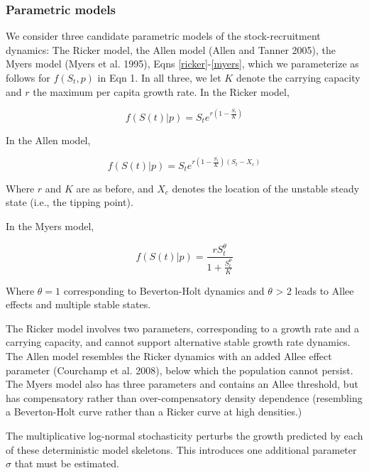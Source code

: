 \documentclass[author-year, 12pt,review]{components/elsarticle} %
\begin{document}
\subsubsection{Parametric models}\label{parametric-models}

We consider three candidate parametric models of the stock-recruitment
dynamics: The Ricker model, the Allen model (Allen and Tanner 2005), the
Myers model (Myers et al. 1995), Eqns \eqref{ricker}-\eqref{myers},
which we parameterize as follows for $f(S_t,p)$ in Eqn 1. In all three,
we let $K$ denote the carrying capacity and $r$ the maximum per capita
growth rate. In the Ricker model,

\begin{equation}
f(S(t)|p) = S_t e^{r \left(1 - \frac{S_t}{K} \right) } \label{ricker}
\end{equation}

In the Allen model,

\begin{equation}
f(S(t)|p) = S_t e^{r \left(1 - \frac{S_t}{K}\right)\left(S_t - X_c\right)} \label{allen}
\end{equation}

Where $r$ and $K$ are as before, and $X_c$ denotes the location of the
unstable steady state (i.e., the tipping point).

In the Myers model,

\begin{equation}
f(S(t) | p)  = \frac{r S_t^{\theta}}{1 + \frac{S_t^\theta}{K}} \label{myers}
\end{equation}

Where $\theta = 1$ corresponding to Beverton-Holt dynamics and $\theta$
\textgreater{} 2 leads to Allee effects and multiple stable states.

The Ricker model involves two parameters, corresponding to a growth rate
and a carrying capacity, and cannot support alternative stable growth
rate dynamics. The Allen model resembles the Ricker dynamics with an
added Allee effect parameter (Courchamp et al. 2008), below which the
population cannot persist. The Myers model also has three parameters and
contains an Allee threshold, but has compensatory rather than
over-compensatory density dependence (resembling a Beverton-Holt curve
rather than a Ricker curve at high densities.)

The multiplicative log-normal stochasticity perturbs the growth
predicted by each of these deterministic model skeletons. This
introduces one additional parameter $\sigma$ that must be estimated.
\end{document}

